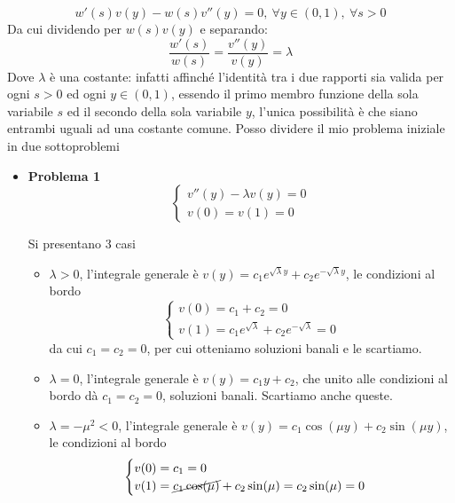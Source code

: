 \documentclass[10pt,a4paper,twoside,openright]{book}
\begin{document}
\begin{equation*}
w'(s) v(y) -w(s) v'' (y) =0,\ \forall y\in (0,1),\ \forall s >0
\end{equation*}
Da cui dividendo per $\displaystyle w(s) v(y)$ e separando:
\begin{equation*}
\frac{w'(s)}{w(s)} =\frac{v'' (y)}{v(y)} =\lambda 
\end{equation*}
Dove $\displaystyle \lambda $ è una costante: infatti affinché l'identità tra i due rapporti sia valida per ogni $s >0$ ed ogni $\displaystyle y\in (0,1)$, essendo il primo membro funzione della sola variabile $s$ ed il secondo della sola variabile $y$, l'unica possibilità è che siano entrambi uguali ad una costante comune. Posso dividere il mio problema iniziale in due sottoproblemi
\begin{itemize}
\item \textbf{Problema 1}
\begin{equation*}
\begin{cases}
v'' (y) -\lambda v(y) =0\\
v(0) =v(1) =0
\end{cases}
\end{equation*}

Si presentano 3 casi
\begin{itemize}
\item $\displaystyle \lambda  >0$, l'integrale generale è $\displaystyle v(y) =c_{1} e^{\sqrt{\lambda } y} +c_{2} e^{-\sqrt{\lambda } y}$, le condizioni al bordo
\begin{equation*}
\begin{cases}
v(0) =c_{1} +c_{2} =0\\
v(1) =c_{1} e^{\sqrt{\lambda }} +c_{2} e^{-\sqrt{\lambda }} =0
\end{cases}
\end{equation*}da cui $\displaystyle c_{1} =c_{2} =0$, per cui otteniamo soluzioni banali e le scartiamo.
\item $\displaystyle \lambda =0$, l'integrale generale è $\displaystyle v(y) =c_{1} y+c_{2}$, che unito alle condizioni al bordo dà $\displaystyle c_{1} =c_{2} =0$, soluzioni banali. Scartiamo anche queste.
\item $\displaystyle \lambda =-\mu ^{2} < 0$, l'integrale generale è $\displaystyle v(y) =c_{1}\cos(\mu y) +c_{2}\sin(\mu y)$, le condizioni al bordo
\begin{equation*}
\begin{cases}
v(0) =c_{1} =0\\
v(1) =\cancel{c_{1}\cos(\mu)} +c_{2}\sin(\mu) =c_{2}\sin(\mu) =0
\end{cases}
\end{equation*}


\end{itemize}
\end{itemize}
\end{document}
